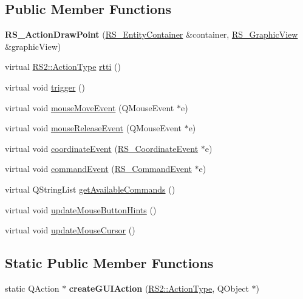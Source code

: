 \subsection*{Public Member Functions}
\begin{DoxyCompactItemize}
\item 
\hypertarget{classRS__ActionDrawPoint_a2b165a251d3aa76a69ed13d921683ae9}{{\bfseries R\-S\-\_\-\-Action\-Draw\-Point} (\hyperlink{classRS__EntityContainer}{R\-S\-\_\-\-Entity\-Container} \&container, \hyperlink{classRS__GraphicView}{R\-S\-\_\-\-Graphic\-View} \&graphic\-View)}\label{classRS__ActionDrawPoint_a2b165a251d3aa76a69ed13d921683ae9}

\item 
virtual \hyperlink{classRS2_afe3523e0bc41fd637b892321cfc4b9d7}{R\-S2\-::\-Action\-Type} \hyperlink{classRS__ActionDrawPoint_a853b194a7955895621ace4bda9740113}{rtti} ()
\item 
virtual void \hyperlink{classRS__ActionDrawPoint_acf48060fef74abc4e006b98f2c28c15b}{trigger} ()
\item 
virtual void \hyperlink{classRS__ActionDrawPoint_a0e246ac1be5f76265cfe18d2edebeff7}{mouse\-Move\-Event} (Q\-Mouse\-Event $\ast$e)
\item 
virtual void \hyperlink{classRS__ActionDrawPoint_a8f3d037a72dc45b61b1b083df5bacc17}{mouse\-Release\-Event} (Q\-Mouse\-Event $\ast$e)
\item 
virtual void \hyperlink{classRS__ActionDrawPoint_ad3e32ec86db28e37e5f4108d56b3f098}{coordinate\-Event} (\hyperlink{classRS__CoordinateEvent}{R\-S\-\_\-\-Coordinate\-Event} $\ast$e)
\item 
virtual void \hyperlink{classRS__ActionDrawPoint_a6b9ac5732b0544c844e5bea310f68ba9}{command\-Event} (\hyperlink{classRS__CommandEvent}{R\-S\-\_\-\-Command\-Event} $\ast$e)
\item 
virtual Q\-String\-List \hyperlink{classRS__ActionDrawPoint_abaf30cdaa4212926a076de611d5e1d96}{get\-Available\-Commands} ()
\item 
virtual void \hyperlink{classRS__ActionDrawPoint_a78d78206db14687940475db41659419d}{update\-Mouse\-Button\-Hints} ()
\item 
virtual void \hyperlink{classRS__ActionDrawPoint_a017a45ebca449540e8cba900ce289445}{update\-Mouse\-Cursor} ()
\end{DoxyCompactItemize}
\subsection*{Static Public Member Functions}
\begin{DoxyCompactItemize}
\item 
\hypertarget{classRS__ActionDrawPoint_a597adc6c362f1cd69ee082ab71e08667}{static Q\-Action $\ast$ {\bfseries create\-G\-U\-I\-Action} (\hyperlink{classRS2_afe3523e0bc41fd637b892321cfc4b9d7}{R\-S2\-::\-Action\-Type}, Q\-Object $\ast$)}\label{classRS__ActionDrawPoint_a597adc6c362f1cd69ee082ab71e08667}

\end{DoxyCompactItemize}

